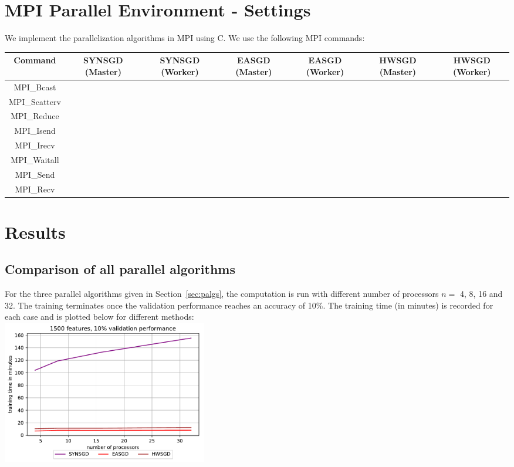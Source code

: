\documentclass[12pt]{article}
\newcommand{\cmark}{\ding{51}}%
\newcommand{\xmark}{\ding{55}}%
\begin{document}
\section{MPI Parallel Environment - Settings}
We implement the parallelization algorithms in MPI using C. We use the following MPI commands:
\begin{table}[ht]
\scriptsize
\centering
\begin{tabular}{ccccccc} 
\toprule
\textbf{Command} & \textbf{SYNSGD} (Master) & \textbf{SYNSGD} (Worker) & \textbf{EASGD} (Master) & \textbf{EASGD} (Worker) & \textbf{HWSGD} (Master) & \textbf{HWSGD} (Worker) \\ \midrule
MPI\_Bcast & \cmark & \cmark & \cmark & \cmark & \cmark & \cmark \\
MPI\_Scatterv & \cmark & \cmark & \xmark & \xmark & \xmark & \xmark \\
MPI\_Reduce  & \cmark & \cmark & \cmark & \cmark & \xmark & \xmark \\
MPI\_Isend & \xmark & \xmark & \xmark & \xmark & \cmark & \xmark \\
MPI\_Irecv & \xmark & \xmark & \xmark & \xmark & \cmark & \xmark \\
MPI\_Waitall & \xmark & \xmark & \xmark & \xmark & \cmark & \xmark \\
MPI\_Send & \xmark & \xmark & \xmark & \xmark & \xmark & \cmark \\
MPI\_Recv & \xmark & \xmark & \xmark & \xmark & \xmark & \cmark \\
\bottomrule
\end{tabular}
\end{table}

\section{Results}
\subsection{Comparison of all parallel algorithms}
For the three parallel algorithms given in Section~\ref{sec:palgs}, the computation is run with different number of processors $n=$ 4, 8, 16 and 32. The training terminates once the validation performance reaches an accuracy of 10\%. The training time (in minutes) is recorded for each case and is plotted below for different methods:\\

{\centering
\includegraphics[width=9cm]{images/1500f_10v_def.pdf}\\
}
\end{document}
